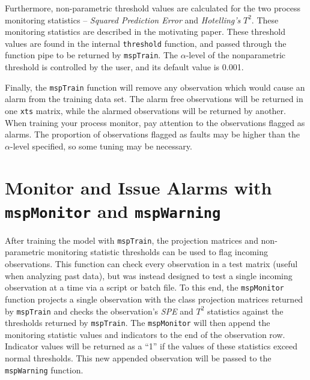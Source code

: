 \documentclass{report}\usepackage[]{graphicx}\usepackage[]{color}
\begin{document}
Furthermore, non-parametric threshold values are calculated for the two process monitoring statistics -- \emph{Squared Prediction Error} and \emph{Hotelling's} $T^2$. These monitoring statistics are described in the motivating paper. These threshold values are found in the internal \texttt{threshold} function, and passed through the function pipe to be returned by \texttt{mspTrain}. The $\alpha$-level of the nonparametric threshold is controlled by the user, and its default value is 0.001.

Finally, the \texttt{mspTrain} function will remove any observation which would cause an alarm from the training data set. The alarm free observations will be returned in one \texttt{xts} matrix, while the alarmed observations will be returned by another. When training your process monitor, pay attention to the observations flagged as alarms. The proportion of observations flagged as faults may be higher than the $\alpha$-level specified, so some tuning may be necessary.




\section{Monitor and Issue Alarms with \texttt{mspMonitor} and \texttt{mspWarning}} \label{sec:D_Alarms}

After training the model with \texttt{mspTrain}, the projection matrices and non-parametric monitoring statistic thresholds can be used to flag incoming observations. This function can check every observation in a test matrix (useful when analyzing past data), but was instead designed to test a single incoming observation at a time via a script or batch file. To this end, the \texttt{mspMonitor} function projects a single observation with the class projection matrices returned by \texttt{mspTrain} and checks the observation's \emph{SPE} and $T^2$ statistics against the thresholds returned by \texttt{mspTrain}. The \texttt{mspMonitor} will then append the monitoring statistic values and indicators to the end of the observation row. Indicator values will be returned as a ``1'' if the values of these statistics exceed normal thresholds. This new appended observation will be passed to the \texttt{mspWarning} function.
\end{document}
